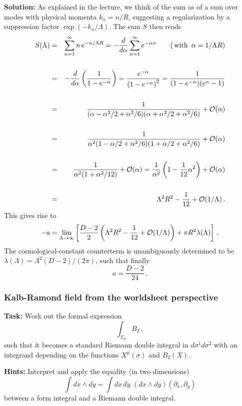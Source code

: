 \documentclass[12pt]{article}
\newcommand{\be}{\begin{equation}}
\newcommand{\ee}{\end{equation}}
\newcommand{\bea}{\begin{eqnarray}}
\newcommand{\eea}{\end{eqnarray}}
\numberwithin{equation}{section}
\begin{document}
\noindent
{\bf Solution:} As explained in the lecture, we think of the sum as of a sum over modes with physical momenta $k_n=n/R$, suggesting a regularization by a suppression factor $\exp(-k_n/\Lambda)$. The sum $S$ then reads
\bea
S(\Lambda)&=&\sum_{n=1}^\infty n\,e^{-n/\Lambda R}=-\frac{d}{d\alpha} \sum_{n=1}^\infty e^{-\alpha n}\qquad (\,\mbox{with}\,\,\, \alpha=1/\Lambda R)
\\
\nonumber \\
&=& -\frac{d}{d\alpha}\left(\frac{1}{1-e^{-\alpha}}\right)=\frac{e^{-\alpha}}{ \left(1-e^{-\alpha}\right)^2}=\frac{1}{(1-e^{-\alpha})(e^\alpha-1)}
\nonumber\\
\nonumber \\
&=& \frac{1}{(\alpha-\alpha^2/2+\alpha^3/6)(\alpha+\alpha^2/2+\alpha^3/6)}+{\cal O}(\alpha)
\nonumber\\
\nonumber\\
&=& \frac{1}{\alpha^2(1-\alpha/2+\alpha^2/6)(1+\alpha/2+\alpha^2/6)} +{\cal O}(\alpha)
\nonumber\\
\nonumber\\
&=& \frac{1}{\alpha^2(1+\alpha^2/12)} +{\cal O}(\alpha)=\frac{1}{\alpha^2}
\left(1-\frac{1}{12}\alpha^2\right) + {\cal O}(\alpha)
\nonumber\\
\nonumber\\
&=& \Lambda^2R^2-\frac{1}{12}+{\cal O}(1/\Lambda)\,.\nonumber
\eea
This gives rise to
\be
-a=\lim_{\Lambda\to\infty}\left[\frac{D-2}{2}\left(\Lambda^2R^2-\frac{1}{12} +{\cal O}(1/\Lambda)\right)+\pi R^2\lambda(\Lambda)\right]\,.
\ee
The cosmological-constant counterterm is unambiguously determined to be\\ 
$\lambda(\Lambda)=\Lambda^2(D-2)/(2\pi)$, such that finally
\be
a=\frac{D-2}{24}\,.
\ee






\subsubsection{Kalb-Ramond field from the worldsheet perspective}

{\bf Task:} Work out the formal expression
\be
\int_{\Sigma_2} B_2\,,
\ee
such that it becomes a standard Riemann double integral in $d\sigma^1d\sigma^2$ with an integrand depending on the functions $X^\mu(\sigma)$ and $B_2(X)$.

\noindent
{\bf Hints:} Interpret and apply the equality (in two dimensions) 
\be
\int dx\wedge dy=\int dx\,dy\,\,(dx\wedge dy)(\partial_x,\partial_y)
\ee
between a form integral and a Riemann double integral.
\end{document}
